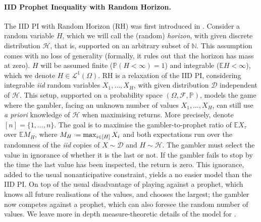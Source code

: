 \documentclass[11pt, a4paper, twoside]{article}
\newcommand*{\defeq}{\mathrel{\vcenter{\baselineskip0.5ex \lineskiplimit0pt
			\hbox{\scriptsize.}\hbox{\scriptsize.}}}=}
\newcommand{\NN}{\mathbb{N}}
\newcommand{\EE}{\mathbb{E}}
\newcommand{\PP}{\mathbb{P}}
\newcommand{\FF}{\mathcal{F}}
\newcommand{\HH}{\mathcal{H}}
\newcommand{\DD}{\mathcal{D}}
\numberwithin{equation}{section}
\begin{document}
	\paragraph{IID Prophet Inequality with Random Horizon.}
	The IID PI with Random Horizon (RH) was first introduced in \cite{HajKleSan07}. Consider a random variable $H$, which we will call the (random) \textit{horizon}, with given discrete distribution $\HH$, that is, supported on an arbitrary subset of $\NN$. This assumption comes with no loss of generality (formally, it rules out that the horizon has mass at zero). $H$ will be assumed finite ($\PP(H<\infty)=1$) and integrable ($\EE H <\infty$), which we denote $H\in\mathcal{L}^1(\Omega)$. RH is a relaxation of the IID PI, considering integrable \textit{iid} random variables $X_1,\ldots,X_H$, with given distribution $\DD$ independent of $\HH$. This setup, supported on a probability space $(\Omega,\FF,\PP)$, models the game where the gambler, facing an unknown number of values $X_1,\ldots,X_H$, can still use \textit{a priori} knowledge of $\HH$ when maximising returns. More precisely, denote $[n]=\{1,\ldots,n\}$. The goal is to maximise the gambler-to-prophet ratio of $\EE X_\tau$ over $\EE M_H$, where $M_H\defeq \max_{i\in[H]}X_i$ and both expectations run over the randomness of the \textit{iid} copies of $X\sim\DD$ and $H\sim\HH$. The gambler must select the value in ignorance of whether it is the last or not. If the gambler fails to stop by the time the last value has been inspected, the return is zero. This ignorance, added to the usual nonanticipative constraint, yields a no easier model than the IID PI. On top of the usual disadvantage of playing against a prophet, which knows all future realisations of the values, and chooses the largest; the gambler now competes against a prophet, which can also foresee the random number of values. We leave more in depth measure-theoretic details of the model for . 
\end{document}
